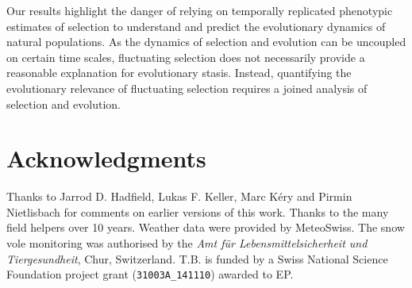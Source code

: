 Our results highlight the danger of relying on temporally replicated phenotypic estimates of selection to understand and predict the evolutionary dynamics of natural populations. As the dynamics of selection and evolution can be uncoupled on certain time scales, fluctuating selection does not necessarily provide a reasonable explanation for evolutionary stasis. Instead, quantifying the evolutionary relevance of fluctuating selection requires a joined analysis of selection and evolution.  

\section*{Acknowledgments}
Thanks to Jarrod D. Hadfield, Lukas F. Keller, Marc K\'{e}ry and Pirmin Nietlisbach for comments on earlier versions of this work. Thanks to the many field helpers over 10 years. Weather data were provided by MeteoSwiss. The snow vole monitoring was authorised by the \textit{Amt f\"{u}r Lebensmittelsicherheit und Tiergesundheit}, Chur, Switzerland. T.B. is funded by a Swiss National Science Foundation project grant (\verb|31003A_141110|) awarded to EP. 

\printbibliography[heading=subbibliography]
